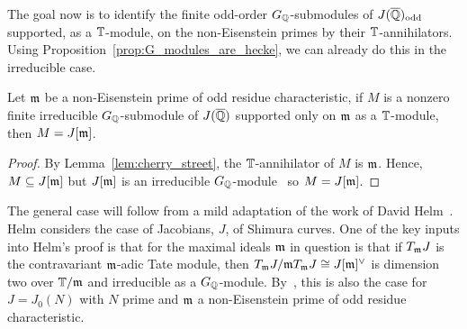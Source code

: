 \documentclass[thesis.tex]{subfiles}
\begin{document}
The goal now is to identify the finite odd-order $G_{\mathbb{Q}}$-submodules of
$J(\overline{\mathbb{Q}})_{\mathrm{odd}}$ supported, as a $\mathbb{T}$-module, on the non-Eisenstein primes by
their $\mathbb{T}$-annihilators. Using Proposition~\ref{prop:G_modules_are_hecke}, we
can already do this in the irreducible case.

\begin{proposition}
    Let $\mathfrak{m}$ be a non-Eisenstein prime of odd residue characteristic, if $M$ is
    a nonzero finite irreducible $G_{\mathbb{Q}}$-submodule of $J(\overline{\mathbb{Q}})$ supported
    only on $\mathfrak{m}$ as a $\mathbb{T}$-module, then $M=J[\mathfrak{m}]$.
\end{proposition}
\begin{proof}
    By Lemma~\ref{lem:cherry_street}, the $\mathbb{T}$-annihilator of $M$ is $\mathfrak{m}$.
    Hence, $M\subseteq J[\mathfrak{m}]$ but $J[\mathfrak{m}]$ is an irreducible
    $G_{\mathbb{Q}}$-module~\cite[Proposition 14.2]{mazur:eisenstein} so $M=J[\mathfrak{m}]$.
\end{proof}

The general case will follow from a mild adaptation of the work of David
Helm~\cite{helm:jacobian}. Helm considers the case of Jacobians, $J$, of
Shimura curves. One of the key inputs into Helm's proof is that for the maximal
ideals $\mathfrak{m}$ in question is that if $T_{\mathfrak{m}} J$ is the contravariant $\mathfrak{m}$-adic Tate
module, then $T_{\mathfrak{m}} J/\mathfrak{m} T_{\mathfrak{m}} J\cong J[\mathfrak{m}]^\vee$ is dimension two over $\mathbb{T}/\mathfrak{m}$
and irreducible as a $G_{\mathbb{Q}}$-module. By~\cite[Prop. 14.2]{mazur:eisenstein},
this is also the case for $J=J_0(N)$ with $N$ prime and $\mathfrak{m}$ a non-Eisenstein
prime of odd residue characteristic.
\end{document}
